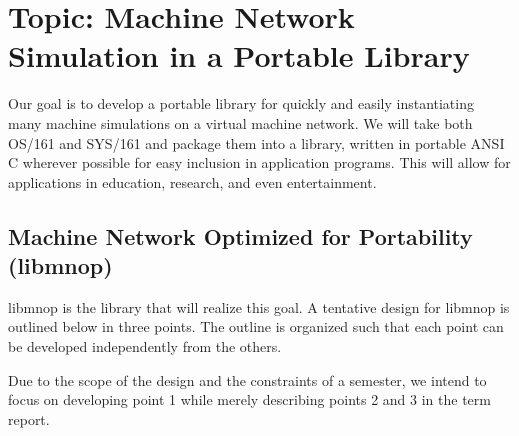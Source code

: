 \documentclass[12pt]{article}
\begin{document}
\section*{Topic: Machine Network Simulation in a Portable Library}
Our goal is to develop a portable library for quickly and easily instantiating many machine simulations on a virtual machine network. We will take both OS/161 and SYS/161 and package them into a library, written in portable ANSI C wherever possible for easy inclusion in application programs. This will allow for applications in education, research, and even entertainment.
\subsection*{Machine Network Optimized for Portability (libmnop)}
libmnop is the library that will realize this goal. A tentative design for libmnop is outlined below in three points. The outline is organized such that each point can be developed independently from the others.

Due to the scope of the design and the constraints of a semester, we intend to focus on developing point 1 while merely describing points 2 and 3 in the term report.
\end{document}
